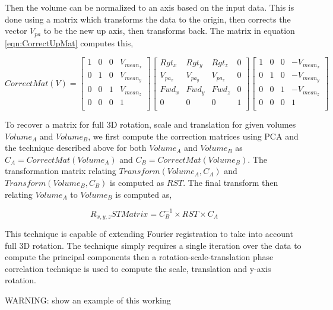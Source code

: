 Then the volume can be normalized to an axis based on the input data. This is done using a matrix which transforms the data to the origin, then corrects the vector $V_{pa}$ to be the new up axis, then transforms back. The matrix in equation \ref{eqn:CorrectUpMat} computes this,


\begin{equation} \label{eqn:CorrectUpMat}
CorrectMat(V) = \left[
\begin{array}{cccc}
1 & 0 & 0 & V_{mean_x} \\
0 & 1 & 0 & V_{mean_y} \\
0 & 0 & 1 & V_{mean_z} \\
0 & 0 & 0 & 1 \\
\end{array}
\right] \left[
\begin{array}{cccc}
Rgt_x & Rgt_y & Rgt_z & 0 \\
V_{pa_x} & V_{pa_y} & V_{pa_z} & 0 \\
Fwd_x & Fwd_y & Fwd_z & 0 \\
0 & 0 & 0 & 1 \\
\end{array}
\right] \left[
\begin{array}{cccc}
1 & 0 & 0 & -V_{mean_x} \\
0 & 1 & 0 & -V_{mean_y} \\
0 & 0 & 1 & -V_{mean_z} \\
0 & 0 & 0 & 1 \\
\end{array}
\right]
\end{equation}


To recover a matrix for full 3D rotation, scale and translation for given volumes $Volume_A$ and $Volume_B$, we first compute the correction matrices using PCA and the technique described above for both $Volume_A$ and $Volume_B$ as $C_A = CorrectMat(Volume_A)$ and $C_B = CorrectMat(Volume_B)$. The transformation matrix relating $Transform(Volume_A, C_A)$ and $Transform(Volume_B, C_B)$ is computed as $RST$. The final transform then relating $Volume_A$ to $Volume_B$ is computed as,

\begin{equation} \label{eqn:FullRSTTransform}
R_{x,y,z}ST Matrix = C_{B}^{-1} \times RST \times C_A
\end{equation}

This technique is capable of extending Fourier registration to take into account full 3D rotation. The technique simply requires a single iteration over the data to compute the principal components then a rotation-scale-translation phase correlation technique is used to compute the scale, translation and y-axis rotation. 

WARNING: show an example of this working